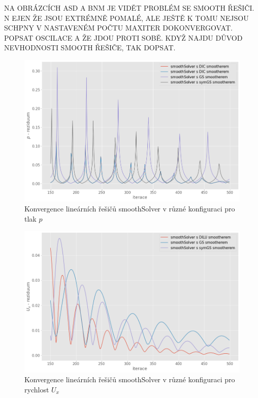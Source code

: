 \documentclass[a4paper,12pt]{report}
\theoremstyle{remark}
\begin{document}
NA OBRÁZCÍCH ASD A BNM JE VIDĚT PROBLÉM SE SMOOTH ŘEŠIČI. N EJEN ŽE JSOU EXTRÉMNĚ POMALÉ, ALE JEŠTĚ K TOMU NEJSOU SCHPNY V NASTAVENÉM POČTU MAXITER DOKONVERGOVAT. POPSAT OSCILACE A ŽE JDOU PROTI SOBĚ. KDYŽ NAJDU DŮVOD NEVHODNOSTI SMOOTH ŘEŠIČE, TAK DOPSAT.

\begin{figure}[H]
	\centering
	\includegraphics[width=1\linewidth]{p-residuum-smooth.png}
	\caption{Konvergence lineárních řešičů smoothSolver v různé konfiguraci pro tlak $p$}
	\label{fig:p-residuum-smooth}
\end{figure}

\begin{figure}[H]
	\centering
	\includegraphics[width=1\linewidth]{ux-residuum-smooth.png}
	\caption{Konvergence lineárních řešičů smoothSolver v různé konfiguraci pro rychlost $U_x$}
	\label{fig:ux-residuum-smooth}
\end{figure}
	
\end{document}
